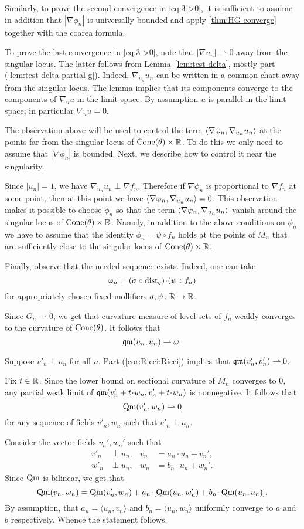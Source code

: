 Similarly, to prove the second convergence in \ref{eq:3->0}, it is sufficient to assume in addition that $|\nabla\phi_n|$ is universally bounded and apply \ref{thm:HG-converge} together with the coarea formula.

To prove the last convergence in \ref{eq:3->0}, note that
$|\nabla u_n|\rightharpoonup 0$ away from the singular locus.
The latter follows from Lemma~\ref{lem:test-delta}, mostly part (\ref{lem:test-delta-partial-g}).
Indeed, $\nabla_{u_n} u_n$ can be written in a common chart away from the singular locus. 
The lemma implies that its components converge to the components of $\nabla_u u$ in the limit space.
By assumption $u$ is parallel in the limit space; in particular $\nabla_uu=0$.

The observation above will be used to control the term $\langle\nabla\varphi_n,\nabla_{u_n} {u_n}\rangle$ at the points far from the singular locus of $\operatorname{Cone}(\theta)\times \mathbb{R}$.
To do this we only need to assume that $|\nabla\phi_n|$ is bounded.
Next, we describe how to control it near the singularity.

Since $|u_n|=1$, we have $\nabla_{u_n} u_n\perp \nabla f_n$.
Therefore if $\nabla \phi_n$ is proportional to $\nabla f_n$ at some point, then at this point we have $\langle\nabla\varphi_n,\nabla_{u_n} {u_n}\rangle=0$.
This observation makes it possible to choose $\phi_n$ so that the term $\langle\nabla\varphi_n,\nabla_{u_n} {u_n}\rangle$ vanish around the singular locus of $\operatorname{Cone}(\theta)\times \mathbb{R}$.
Namely, in addition to the above conditions on $\phi_n$ we have to assume that the identity $\phi_n=\psi\circ f_n$ holds at the points of $M_n$ that are sufficiently close to the singular locus of $\operatorname{Cone}(\theta)\times \mathbb{R}$.

Finally, observe that the needed sequence exists.
Indeed, one can take 
\[\phi_n=(\sigma\circ \dist_q)\cdot (\psi\circ f_n)\]
for appropriately chosen fixed mollifiers $\sigma,\psi\colon\mathbb{R}\to \mathbb{R}$.

Since $G_n\rightharpoonup 0$, we get that curvature measure of level sets of $f_n$ weakly converges to the curvature of $\operatorname{Cone}(\theta)$.
It follows that 
\[\operatorname{\mathfrak{qm}}(u_n,u_n)\rightharpoonup \omega.\]

Suppose $v'_n\perp u_n$ for all $n$.
Part (\ref{cor:Ricci:Ricci}) implies that  $\operatorname{\mathfrak{qm}}(v'_n,v'_n)\rightharpoonup 0$.

Fix $t\in \mathbb{R}$.
Since the lower bound on sectional curvature of $M_n$ converges to $0$, any partial weak limit of $\qm(v'_n+t\cdot w_n,v'_n+t\cdot w_n)$ is nonnegative.
It follows that 
\[\operatorname{\rm Qm}(v'_n, w_n)\rightharpoonup 0\] for any sequence of fields $v'_n,w_n$ such that $v'_n\perp u_n$.

Consider the vector fields $v_n',w_n'$ such that 
\begin{align*}
v'_n&\perp u_n,
&
v_n&=a_n\cdot u_n+v_n',
\\
w'_n&\perp u_n,
&
w_n&=b_n\cdot u_n+w_n'.
\end{align*}
Since $\operatorname{\rm Qm}$ is bilinear, we get that
\[\Qm(v_n,w_n)=\Qm(v_n',w_n) + a_n\cdot [\Qm(u_n,w_n')+ b_n\cdot \Qm(u_n,u_n)].\]
By assumption, that $a_n=\langle u_n,v_n\rangle $ and $b_n=\langle u_n,w_n\rangle$ uniformly converge to $a$ and $b$ respectively.
Whence the statement follows.
\qeds


